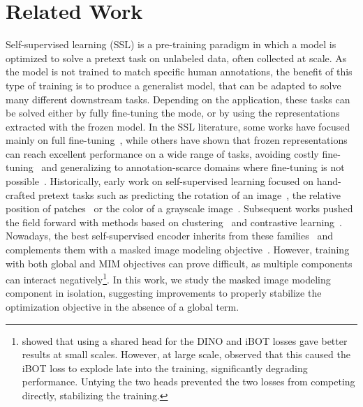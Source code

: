 \section{Related Work}
\label{sec:related}

Self-supervised learning (SSL) is a pre-training paradigm in which a model is optimized to solve a pretext task on unlabeled data, often collected at scale.
As the model is not trained to match specific human annotations, the benefit of this type of training is to produce a generalist model, that can be adapted to solve many different downstream tasks.
Depending on the application, these tasks can be solved either by fully fine-tuning the mode, or by using the representations extracted with the frozen model.
In the SSL literature, some works have focused mainly on full fine-tuning~\citep{he2021masked,huang2023contrastive}, while others have shown that frozen representations can reach excellent performance on a wide range of tasks, avoiding costly fine-tuning~\citep{dinov2} and generalizing to annotation-scarce domains where fine-tuning is not possible~\citep{tolan2024very,gigapath}.
Historically, early work on self-supervised learning focused on hand-crafted pretext tasks such as predicting the rotation of an image~\citep{gidaris2018unsupervised}, the relative position of patches~\citep{doersch2015unsupervised} or the color of a grayscale image~\citep{zhang2016colorful}.
Subsequent works pushed the field forward with methods based on clustering~\citep{deepcluster,swav,dino} and contrastive learning~\citep{simclr,he2020momentum}.
Nowadays, the best self-supervised encoder inherits from these families~\citep{dinov2} and complements them with a masked image modeling objective~\citep{ibot}.
However, training with both global and MIM objectives can prove difficult, as multiple components can interact negatively\footnote{
\citet{ibot} showed that using a shared head for the DINO and iBOT losses gave better results at small scales.
However, at large scale, \citet{dinov2} observed that this caused the iBOT loss to explode late into the training, significantly degrading performance.
Untying the two heads prevented the two losses from competing directly, stabilizing the training.
}.
In this work, we study the masked image modeling component in isolation, suggesting improvements to properly stabilize the optimization objective in the absence of a global term.

